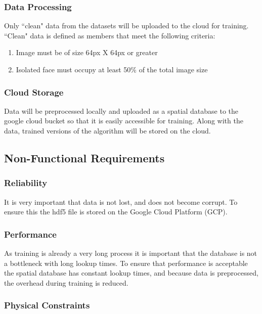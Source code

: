 \documentclass[12pt]{article}
\begin{document}
\subsubsection{Data Processing} \label{data processing}

Only ``clean" data from the datasets will be uploaded to the cloud for training. ``Clean" data
is defined as members that meet the following criteria:\\

\begin{enumerate}
    \item Image must be of size 64px X 64px or greater
    \item Isolated face must occupy at least 50\% of the total image size
\end{enumerate}

\subsubsection{Cloud Storage}

Data will be preprocessed locally and uploaded as a spatial
database to the google cloud bucket so that
it is easily accessible for training. Along with the data, trained versions of the algorithm
will be stored on the cloud. 

\subsection{Non-Functional Requirements}

\subsubsection {Reliability}

It is very important that data is not lost, and does not become corrupt. To ensure this the hdf5 file is stored on
the Google Cloud Platform (GCP).

\subsubsection {Performance}

As training is already a very long process it is important that the database is not a bottleneck with long lookup times. To ensure that performance is acceptable the spatial database has constant lookup times, and because data is preprocessed, the overhead during training is reduced.

\subsubsection {Physical Constraints}
\end{document}
